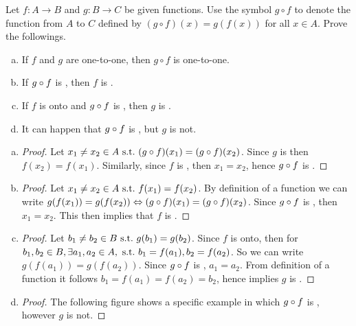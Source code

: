 \begin{question}
	Let $f: A \rightarrow B$ and $g: B \rightarrow C$ be given functions. Use the symbol $g \circ f$ to denote the function from $A$ to $C$ defined by $(g \circ f)(x) = g(f(x))$ for all $x \in A$. Prove the followings. 
	
	\begin{enumerate}[(a)]
		\item If $f$ and $g$ are one-to-one, then $g \circ f$ is one-to-one.
		\item If $g \circ f$ is \oo, then $f$ is \oo.
		\item If $f$ is onto and $g \circ f$ is \oo, then $g$ is \oo.
		\item It can happen that $g \circ f$ is \oo, but $g$ is not. 
	\end{enumerate}
\end{question}
\begin{ans}
	\begin{enumerate}[(a)]
		\item \begin{proof}
			Let $x_1 \neq x_2 \in A \ \text{s.t.}\  (g \circ f)(x_1)  = (g \circ f)(x_2)$. Since $g$ is \oo then $f(x_2) = f(x_1)$. Similarly, since $f$ is \oo, then $x_1 = x_2$, hence $g \circ f$ is \oo.
		\end{proof}
		\item \begin{proof}
			Let $x_1 \neq x_2 \in A \ \text{s.t.}\  f(x_1) = f(x_2)$. By definition of a function we can write $g(f(x_1)) = g(f(x_2)) \Leftrightarrow (g \circ f)(x_1) = (g \circ f)(x_2)$. Since $g \circ f$ is \oo, then $x_1 = x_2$. This then implies that  $f$ is \oo. 
		\end{proof}
		\item \begin{proof}
			Let $b_1 \neq b_2 \in B \ \text{s.t.}\  g(b_1) = g(b_2)$. Since $f$ is onto, then for $b_1, b_2 \in B, \exists a_1, a_2 \in A, \ \text{s.t.}\  b_1 = f(a_1), b_2 = f(a_2)$. So we can write $g(f(a_1)) = g(f(a_2))$. Since $g \circ f$ is \oo, $a_1 = a_2$. From definition of a function it follows $b_1 = f(a_1) = f(a_2) = b_2$, hence implies $g$ is \oo.
		\end{proof}
		\item \begin{proof}
			The following figure shows a specific example in which $g \circ f$ is \oo, however $g$ is not. 
			
		\end{proof}
	\end{enumerate}
\end{ans}
\newpage









